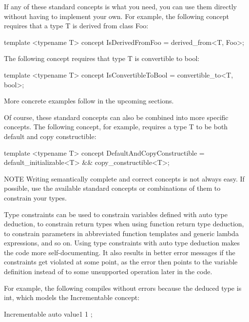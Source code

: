 If any of these standard concepts is what you need, you can use them directly without having to implement your own. For example, the following concept requires that a type T is derived from class Foo:

\begin{cpp}
template <typename T>
concept IsDerivedFromFoo = derived_from<T, Foo>;
\end{cpp}

The following concept requires that type T is convertible to bool:

\begin{cpp}
template <typename T>
concept IsConvertibleToBool = convertible_to<T, bool>;
\end{cpp}

More concrete examples follow in the upcoming sections.

Of course, these standard concepts can also be combined into more specific concepts. The following concept, for example, requires a type T to be both default and copy constructible:

\begin{cpp}
template <typename T>
concept DefaultAndCopyConstructible =
    default_initializable<T> && copy_constructible<T>;
\end{cpp}

\begin{myNotic}{NOTE}
Writing semantically complete and correct concepts is not always easy. If possible, use the available standard concepts or combinations of them to constrain your types.
\end{myNotic}


Type constraints can be used to constrain variables defined with auto type deduction, to constrain return types when using function return type deduction, to constrain parameters in abbreviated function templates and generic lambda expressions, and so on. Using type constraints with auto type deduction makes the code more self-documenting. It also results in better error messages if the constraints get violated at some point, as the error then points to the variable definition instead of to some unsupported operation later in the code.

For example, the following compiles without errors because the deduced type is int, which models the Incrementable concept:

\begin{cpp}
Incrementable auto value1 { 1 };
\end{cpp}


